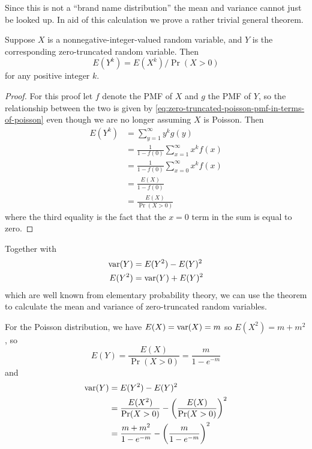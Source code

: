 Since this is not a ``brand name distribution'' the mean and variance
cannot just be looked up.  In aid of this calculation we prove a rather
trivial general theorem.
\begin{theorem} \label{th:truncated-mean-variance}
Suppose $X$ is a nonnegative-integer-valued random variable,
and $Y$ is the corresponding zero-truncated random variable.  Then
$$
   E(Y^k) = E(X^k) / \Pr(X > 0)
$$
for any positive integer $k$.
\end{theorem}
\begin{proof}
For this proof let $f$ denote the PMF of $X$ and $g$ the PMF of $Y$, so
the relationship between the two is given
by \eqref{eq:zero-truncated-poisson-pmf-in-terms-of-poisson}
even though we are no longer assuming $X$ is Poisson.  Then
\begin{align*}
   E(Y^k)
   & =
   \sum_{y = 1}^\infty y^k g(y)
   \\
   & =
   \frac{1}{1 - f(0)} \sum_{x = 1}^\infty x^k f(x)
   \\
   & =
   \frac{1}{1 - f(0)} \sum_{x = 0}^\infty x^k f(x)
   \\
   & =
   \frac{E(X)}{1 - f(0)}
   \\
   & =
   \frac{E(X)}{\Pr(X > 0)}
\end{align*}
where the third equality is the fact that the $x = 0$ term in the sum
is equal to zero.
\end{proof}
Together with
\begin{align*}
   \operatorname{var}(Y) & = E(Y^2) - E(Y)^2
   \\
   E(Y^2) & = \operatorname{var}(Y) + E(Y)^2
\end{align*}
which are well known from elementary probability theory, we can use the
theorem to calculate the mean and variance of zero-truncated random variables.

For the Poisson distribution, we have $E(X) = \operatorname{var}(X) = m$
so $E(X^2) = m + m^2$, so
\begin{equation} \label{eq:mean-of-zero-truncated-Poisson}
   E(Y)
   =
   \frac{E(X)}{\Pr(X > 0)}
   =
   \frac{m}{1 - e^{- m}}
\end{equation}
and
\begin{equation} \label{eq:variance-of-zero-truncated-Poisson}
\begin{split}
   \operatorname{var}(Y)
   & =
   E(Y^2) - E(Y)^2
   \\
   & =
   \frac{E(X^2)}{\Pr(X > 0)} - \left(\frac{E(X)}{\Pr(X > 0)}\right)^2
   \\
   & =
   \frac{m + m^2}{1 - e^{- m}} - \left( \frac{m}{1 - e^{- m}} \right)^2
\end{split}
\end{equation}

